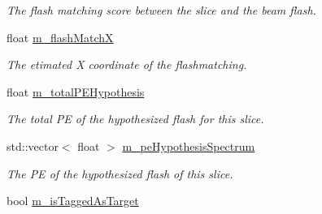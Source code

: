\begin{DoxyCompactItemize}
\begin{DoxyCompactList}\small\item\em The flash matching score between the slice and the beam flash. \end{DoxyCompactList}\item 
float \hyperlink{classflashmatch_1_1FlashMatchingTool_1_1SliceCandidate_aec191712b4926ad8aa36c1d2cec63b72}{m\+\_\+flash\+MatchX}\hypertarget{classflashmatch_1_1FlashMatchingTool_1_1SliceCandidate_aec191712b4926ad8aa36c1d2cec63b72}{}\label{classflashmatch_1_1FlashMatchingTool_1_1SliceCandidate_aec191712b4926ad8aa36c1d2cec63b72}

\begin{DoxyCompactList}\small\item\em The etimated X coordinate of the flashmatching. \end{DoxyCompactList}\item 
float \hyperlink{classflashmatch_1_1FlashMatchingTool_1_1SliceCandidate_a00f51554630d8efb1e510956b4cc01c7}{m\+\_\+total\+P\+E\+Hypothesis}\hypertarget{classflashmatch_1_1FlashMatchingTool_1_1SliceCandidate_a00f51554630d8efb1e510956b4cc01c7}{}\label{classflashmatch_1_1FlashMatchingTool_1_1SliceCandidate_a00f51554630d8efb1e510956b4cc01c7}

\begin{DoxyCompactList}\small\item\em The total PE of the hypothesized flash for this slice. \end{DoxyCompactList}\item 
std\+::vector$<$ float $>$ \hyperlink{classflashmatch_1_1FlashMatchingTool_1_1SliceCandidate_a349938ff23f29896d514cb5f1165ecae}{m\+\_\+pe\+Hypothesis\+Spectrum}\hypertarget{classflashmatch_1_1FlashMatchingTool_1_1SliceCandidate_a349938ff23f29896d514cb5f1165ecae}{}\label{classflashmatch_1_1FlashMatchingTool_1_1SliceCandidate_a349938ff23f29896d514cb5f1165ecae}

\begin{DoxyCompactList}\small\item\em The PE of the hypothesized flash of this slice. \end{DoxyCompactList}\item 
bool \hyperlink{classflashmatch_1_1FlashMatchingTool_1_1SliceCandidate_a0122dfd452b75e98197ed203f39c1a69}{m\+\_\+is\+Tagged\+As\+Target}\hypertarget{classflashmatch_1_1FlashMatchingTool_1_1SliceCandidate_a0122dfd452b75e98197ed203f39c1a69}{}\label{classflashmatch_1_1FlashMatchingTool_1_1SliceCandidate_a0122dfd452b75e98197ed203f39c1a69}


\end{DoxyCompactItemize}

